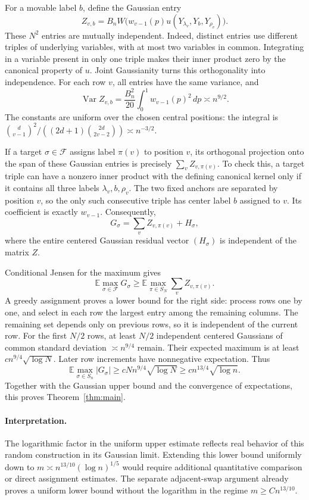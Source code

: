 \documentclass[11pt]{article}
\newcommand{\E}{\mathbb E}
\newcommand{\Var}{\operatorname{Var}}
\begin{document}
For a movable label $b$, define the Gaussian entry
\[
 Z_{v,b}=B_nW\bigl(w_{v-1}(p)
                     u(Y_{\lambda_v},Y_b,Y_{\rho_v})\bigr).
\]
These $N^2$ entries are mutually independent. Indeed, distinct entries use
different triples of underlying variables, with at most two variables in
common. Integrating in a variable present in only one triple makes their
inner product zero by the canonical property of $u$. Joint Gaussianity
turns this orthogonality into independence.
For each row $v$, all entries have the same variance, and
\[
 \Var Z_{v,b}=
 \frac{B_n^2}{20}\int_0^1w_{v-1}(p)^2\,dp\asymp n^{9/2}.
\]
The constants are uniform over the chosen central positions: the integral
is $\binom d{v-1}^2/((2d+1)\binom{2d}{2v-2})\asymp n^{-3/2}$.

If a target $\sigma\in\mathcal F$ assigns label $\pi(v)$ to position $v$,
its orthogonal projection onto the span of these Gaussian entries is
precisely $\sum_vZ_{v,\pi(v)}$. To check this, a target triple can have a
nonzero inner product with the defining canonical kernel only if it
contains all three labels $\lambda_v,b,\rho_v$. The two fixed anchors
are separated by position $v$, so the only such consecutive triple has
center label $b$ assigned to $v$. Its coefficient is exactly $w_{v-1}$.
Consequently,
\[
 G_\sigma=\sum_vZ_{v,\pi(v)}+H_\sigma,
\]
where the entire centered Gaussian residual vector $(H_\sigma)$ is
independent of the matrix $Z$.

Conditional Jensen for the maximum gives
\[
 \E\max_{\sigma\in\mathcal F}G_\sigma
 \geq\E\max_{\pi\in S_N}\sum_vZ_{v,\pi(v)}.
\]
A greedy assignment proves a lower bound for the right side: process rows
one by one, and select in each row the largest entry among the remaining
columns. The remaining set depends only on previous rows, so it is
independent of the current row. For the first $N/2$ rows, at least $N/2$
independent centered Gaussians of common standard deviation
$\asymp n^{9/4}$ remain. Their expected maximum is at least
$c n^{9/4}\sqrt{\log N}$. Later row increments have nonnegative expectation.
Thus
\[
 \E\max_{\sigma\in S_n}|G_\sigma|
 \geq cNn^{9/4}\sqrt{\log N}
 \geq c n^{13/4}\sqrt{\log n}.
\]
Together with the Gaussian upper bound and the convergence of expectations,
this proves Theorem~\ref{thm:main}.

\paragraph{Interpretation.}
The logarithmic factor in the uniform upper estimate reflects real
behavior of this random construction in its Gaussian limit. Extending this
lower bound uniformly down to $m\asymp n^{13/10}(\log n)^{1/5}$ would require
additional quantitative comparison or direct assignment estimates.
The separate adjacent-swap argument already proves a uniform lower bound
without the logarithm in the regime $m\geq Cn^{13/10}$.
\end{document}
